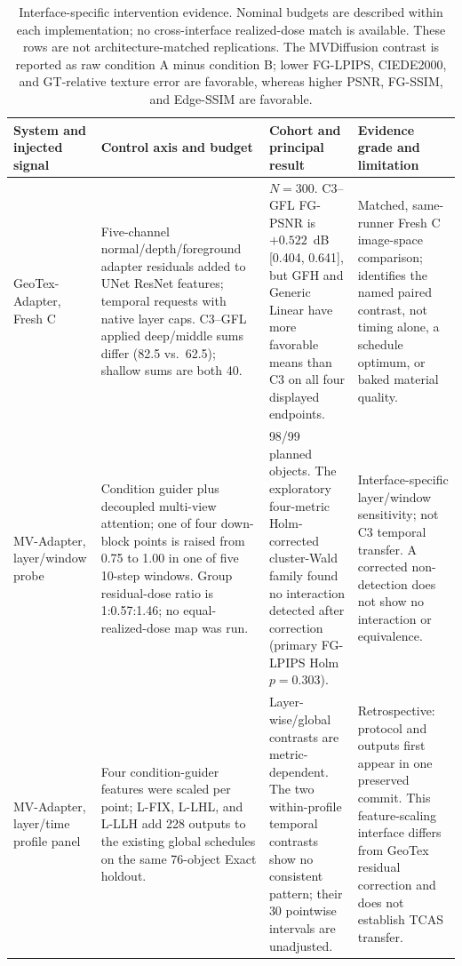 \documentclass[times,twocolumn,final]{elsarticle}
\begin{document}
\begin{table}[t]
\centering
\scriptsize
\setlength{\tabcolsep}{3pt}
\caption{Interface-specific intervention evidence. Nominal budgets are described within each implementation; no cross-interface realized-dose match is available. These rows are not architecture-matched replications. The MVDiffusion contrast is reported as raw condition A minus condition B; lower FG-LPIPS, CIEDE2000, and GT-relative texture error are favorable, whereas higher PSNR, FG-SSIM, and Edge-SSIM are favorable.}
\label{tab:cross-interface}
\begin{tabular}{p{2.4cm}p{4.0cm}p{4.2cm}p{4.5cm}}
\toprule
System and injected signal & Control axis and budget & Cohort and principal result & Evidence grade and limitation \\
\midrule
GeoTex-Adapter, Fresh C &
Five-channel normal/depth/foreground adapter residuals added to UNet ResNet features; temporal requests with native layer caps. C3--GFL applied deep/middle sums differ (82.5 vs.\ 62.5); shallow sums are both 40. &
$N=300$. C3--GFL FG-PSNR is $+0.522$~dB [0.404, 0.641], but GFH and Generic Linear have more favorable means than C3 on all four displayed endpoints. &
Matched, same-runner Fresh C image-space comparison; identifies the named paired contrast, not timing alone, a schedule optimum, or baked material quality. \\
MV-Adapter, layer/window probe &
Condition guider plus decoupled multi-view attention; one of four down-block points is raised from 0.75 to 1.00 in one of five 10-step windows. Group residual-dose ratio is 1:0.57:1.46; no equal-realized-dose map was run. &
98/99 planned objects. The exploratory four-metric Holm-corrected cluster-Wald family found no interaction detected after correction (primary FG-LPIPS Holm $p=0.303$). &
Interface-specific layer/window sensitivity; not C3 temporal transfer. A corrected non-detection does not show no interaction or equivalence. \\
MV-Adapter, layer/time profile panel &
Four condition-guider features were scaled per point; L-FIX, L-LHL, and L-LLH add 228 outputs to the existing global schedules on the same 76-object Exact holdout. &
Layer-wise/global contrasts are metric-dependent. The two within-profile temporal contrasts show no consistent pattern; their 30 pointwise intervals are unadjusted. &
Retrospective: protocol and outputs first appear in one preserved commit. This feature-scaling interface differs from GeoTex residual correction and does not establish TCAS transfer. \\

\end{tabular}
\end{table}
\end{document}
